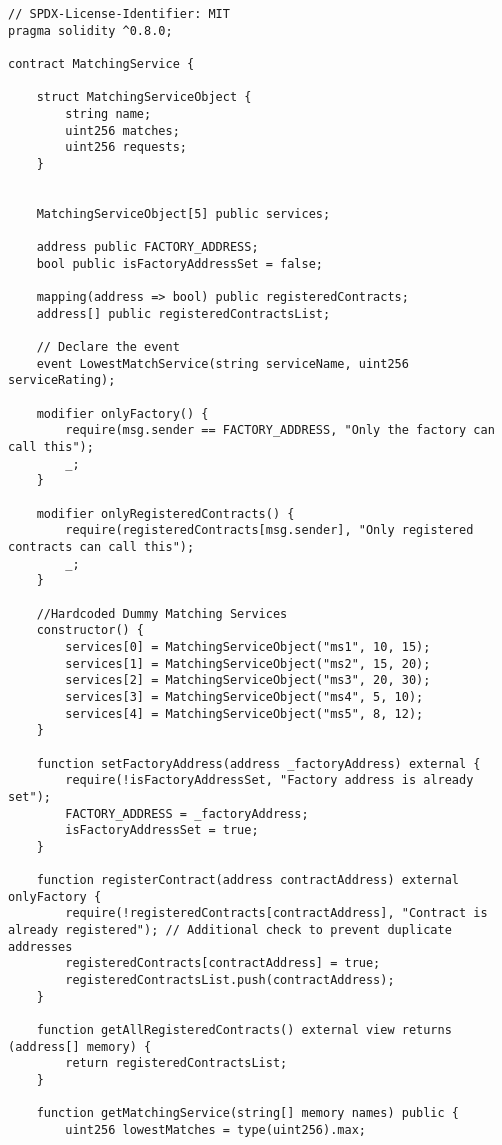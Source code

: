 \lstset{
  basicstyle=\footnotesize\ttfamily,
  breaklines=true,
  numbers=left,
  firstnumber=1,
}

\begin{lstlisting}
// SPDX-License-Identifier: MIT
pragma solidity ^0.8.0;

contract MatchingService {

    struct MatchingServiceObject {
        string name;
        uint256 matches;
        uint256 requests;
    }


    MatchingServiceObject[5] public services;

    address public FACTORY_ADDRESS;
    bool public isFactoryAddressSet = false;

    mapping(address => bool) public registeredContracts;
    address[] public registeredContractsList; 

    // Declare the event
    event LowestMatchService(string serviceName, uint256 serviceRating);

    modifier onlyFactory() {
        require(msg.sender == FACTORY_ADDRESS, "Only the factory can call this");
        _;
    }

    modifier onlyRegisteredContracts() {
        require(registeredContracts[msg.sender], "Only registered contracts can call this");
        _;
    }

    //Hardcoded Dummy Matching Services 
    constructor() {
        services[0] = MatchingServiceObject("ms1", 10, 15);
        services[1] = MatchingServiceObject("ms2", 15, 20);
        services[2] = MatchingServiceObject("ms3", 20, 30);
        services[3] = MatchingServiceObject("ms4", 5, 10);
        services[4] = MatchingServiceObject("ms5", 8, 12);
    }

    function setFactoryAddress(address _factoryAddress) external {
        require(!isFactoryAddressSet, "Factory address is already set");
        FACTORY_ADDRESS = _factoryAddress;
        isFactoryAddressSet = true;
    }

    function registerContract(address contractAddress) external onlyFactory {
        require(!registeredContracts[contractAddress], "Contract is already registered"); // Additional check to prevent duplicate addresses
        registeredContracts[contractAddress] = true;
        registeredContractsList.push(contractAddress); 
    }

    function getAllRegisteredContracts() external view returns (address[] memory) {
        return registeredContractsList;
    }

    function getMatchingService(string[] memory names) public {
        uint256 lowestMatches = type(uint256).max;


\end{lstlisting}
